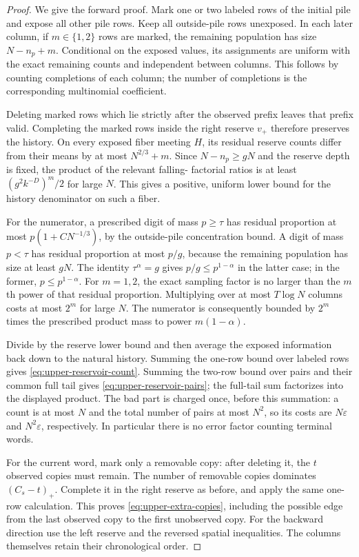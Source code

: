 \documentclass[11pt]{article}
\numberwithin{equation}{section}
\theoremstyle{definition}
\theoremstyle{remark}
\newcommand{\1}{\mathbf 1}
\begin{document}
\begin{proof}
We give the forward proof. Mark one or two labeled rows of the
initial pile and expose all other pile rows. Keep all outside-pile
rows unexposed. In each later column, if $m\in\{1,2\}$ rows are
marked, the remaining population has size $N-n_p+m$. Conditional
on the exposed values, its assignments are uniform with the exact
remaining counts and independent between columns. This follows
by counting completions of each column; the number of completions
is the corresponding multinomial coefficient.

Deleting marked rows which lie strictly after the observed prefix
leaves that prefix valid. Completing the marked rows inside the
right reserve $v_+$ therefore preserves the history. On every
exposed fiber meeting $H$, its residual reserve counts differ from
their means by at most $N^{2/3}+m$. Since $N-n_p\ge gN$ and
the reserve depth is fixed, the product of the relevant falling-
factorial ratios is at least $(g^2k^{-D})^m/2$ for large $N$.
This gives a positive, uniform lower bound for the history denominator
on such a fiber.

For the numerator, a prescribed digit of mass $p\ge\tau$ has
residual proportion at most $p(1+CN^{-1/3})$, by the outside-pile
concentration bound. A digit of mass $p<\tau$ has residual
proportion at most $p/g$, because the remaining population has
size at least $gN$. The identity $\tau^\alpha=g$ gives
$p/g\le p^{1-\alpha}$ in the latter case; in the former,
$p\le p^{1-\alpha}$. For $m=1,2$, the exact sampling factor is
no larger than the $m$th power of that residual proportion.
Multiplying over at most $T\log N$ columns costs at most $2^m$
for large $N$. The numerator is consequently bounded by
$2^m$ times the prescribed product mass to power $m(1-\alpha)$.

Divide by the reserve lower bound and then average the exposed
information back down to the natural history. Summing the one-row
bound over labeled rows gives \eqref{eq:upper-reservoir-count}.
Summing the two-row bound over pairs and their common full tail
gives \eqref{eq:upper-reservoir-pairs}; the full-tail sum factorizes
into the displayed product. The bad part is charged once, before
this summation: a count is at most $N$ and the total number of
pairs at most $N^2$, so its costs are $N\varepsilon$ and
$N^2\varepsilon$, respectively. In particular there is no error
factor counting terminal words.

For the current word, mark only a removable copy: after deleting it,
the $t$ observed copies must remain. The number of removable copies
dominates $(C_s-t)_+$. Complete it in the right reserve as before,
and apply the same one-row calculation. This proves
\eqref{eq:upper-extra-copies}, including the possible edge from the
last observed copy to the first unobserved copy. For the backward
direction use the left reserve and the reversed spatial inequalities.
The columns themselves retain their chronological order.
\end{proof}
\end{document}
